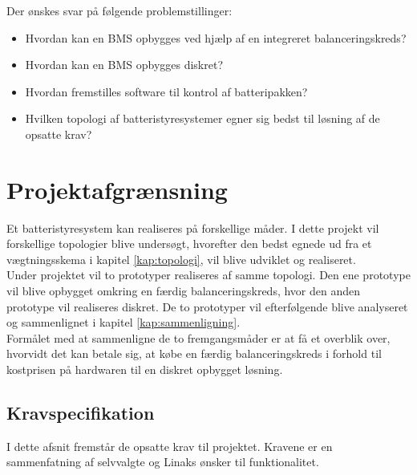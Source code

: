Der ønskes svar på følgende problemstillinger: 

\begin{itemize}[noitemsep]
	\item Hvordan kan en BMS opbygges ved hjælp af en integreret balanceringskreds?
	\item Hvordan kan en BMS opbygges diskret? 
	\item Hvordan fremstilles software til kontrol af batteripakken?
	\item Hvilken topologi af batteristyresystemer egner sig bedst til løsning af de opsatte krav?
\end{itemize}

\section{Projektafgrænsning}
Et batteristyresystem kan realiseres på forskellige måder. I dette projekt vil forskellige topologier blive undersøgt, hvorefter den bedst egnede ud fra et vægtningsskema i kapitel \ref{kap:topologi}, vil blive udviklet og realiseret. 
\\

Under projektet vil to prototyper realiseres af samme topologi. Den ene prototype vil blive opbygget omkring en færdig balanceringskreds, hvor den anden prototype vil realiseres diskret. De to prototyper vil efterfølgende blive analyseret og sammenlignet i kapitel \ref{kap:sammenligning}.
\\

Formålet med at sammenligne de to fremgangsmåder er at få et overblik over, hvorvidt det kan betale sig, at købe en færdig balanceringskreds i forhold til kostprisen på hardwaren til en diskret opbygget løsning.


\subsection{Kravspecifikation} \label{afs:kravspecifikation}
I dette afsnit fremstår de opsatte krav til projektet. Kravene er en sammenfatning af selvvalgte og Linaks ønsker til funktionalitet.


